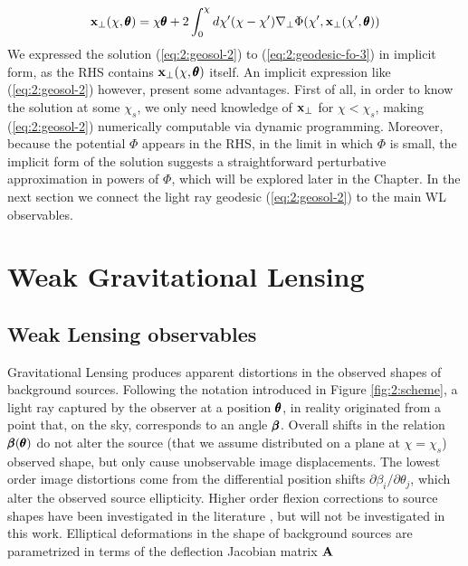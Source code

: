 \begin{equation}
\label{eq:2:geosol-2}
\mathbf{x}_\perp(\chi,\pmb{\theta}) = \chi\pmb{\theta} + 2\int_0^\chi d\chi'(\chi-\chi')\nabla_\perp\Phi(\chi',\mathbf{x}_\perp(\chi',\pmb{\theta}))
\end{equation} 
%
We expressed the solution (\ref{eq:2:geosol-2}) to (\ref{eq:2:geodesic-fo-3}) in implicit form, as the RHS contains $\mathbf{x}_\perp(\chi,\pmb{\theta})$ itself. An implicit expression like (\ref{eq:2:geosol-2}) however, present some advantages. First of all, in order to know the solution at some $\chi_s$, we only need knowledge of $\mathbf{x}_\perp$ for $\chi<\chi_s$, making (\ref{eq:2:geosol-2}) numerically computable via dynamic programming. Moreover, because the potential $\Phi$ appears in the RHS, in the limit in which $\Phi$ is small, the implicit form of the solution suggests a straightforward perturbative approximation in powers of $\Phi$\citep{BornFlexion}, which will be explored later in the Chapter. In the next section we connect the light ray geodesic (\ref{eq:2:geosol-2}) to the main WL observables.  



\section{Weak Gravitational Lensing}

\subsection{Weak Lensing observables}
Gravitational Lensing produces apparent distortions in the observed shapes of background sources. Following the notation introduced in Figure \ref{fig:2:scheme}, a light ray captured by the observer at a position $\pmb{\theta}$, in reality originated from a point that, on the sky, corresponds to an angle $\pmb{\beta}$. Overall shifts in the relation $\pmb{\beta}(\pmb{\theta})$ do not alter the source (that we assume distributed on a plane at $\chi=\chi_s$) observed shape, but only cause unobservable image displacements. The lowest order image distortions come from the differential position shifts $\partial \beta_i/\partial \theta_j$, which alter the observed source ellipticity. Higher order flexion corrections to source shapes have been investigated in the literature \citep{BornFlexion}, but will not be investigated in this work. Elliptical deformations in the shape of background sources are parametrized in terms of the deflection Jacobian matrix $\mathbf{A}$

